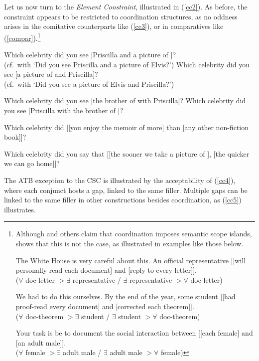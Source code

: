\documentclass[output=paper]{langsci/langscibook}
\begin{document}
Let us now turn to the \emph{Element Constraint},  illustrated in (\ref{cc2}). As before, the constraint appears to be restricted to coordination structures, as no  oddness arises in the comitative counterparts like  (\ref{cc3}), or in comparatives like (\ref{compar}).\footnote{Although \citet[83]{winter01} and others claim that coordination imposes semantic scope islands, \citet[3.6]{chavesthesis} shows that this is not the case, as illustrated in examples like those below.

\eal
\ex The White House is very careful about this. An official representative [[will
              personally read each document] and [reply to every letter]].\\
              ($\forall$ doc-letter $>$$\exists$ representative / $\exists$ representative $>$$\forall$ doc-letter)

\ex We had to do this ourselves. By the end of the year,
some student [[had proof-read every document] and [corrected each
theorem]].\\
($\forall$  doc-theorem $>$$\exists$ student / $\exists$ student $>$$\forall$ doc-theorem)

\ex Your task is be to document the social interaction
between [[each female] and [an adult male]].\\
($\forall$ female $>$$\exists$ adult male / $\exists$ adult male $>$$\forall$ female)
\zllast
}


 

\eal
\label{cc2}
\ex  \bad{*}Which celebrity did you see [Priscilla and a picture of \spc]?\\
(cf.\ with `Did you see Priscilla and a picture of Elvis?')
\ex \bad{*}Which celebrity did you see [a picture of \spc and Priscilla]?\\
(cf.\ with `Did you see a picture of Elvis and Priscilla?')
\zl

\eal 
\label{cc3} 
\ex Which celebrity did you see [the brother of \spc with Priscilla]?
\ex Which celebrity did you see [Priscilla with the brother of \spc]?
\zl

\ea 
\ea Which celebrity did  [[you enjoy the memoir of \spcs more] than
                                 [any other non-fiction book]]?

\item Which celebrity did you say that [[the sooner we take a picture of \spc ],
[the quicker we can go home]]?
\z \label{compar} 
\z


The ATB exception to the CSC is illustrated by the acceptability of (\ref{cc4}), where each conjunct hosts a gap, linked to the same filler. Multiple gaps can be linked to the same filler in other constructions besides  coordination, as  (\ref{cc5}) illustrates. 
\end{document}
